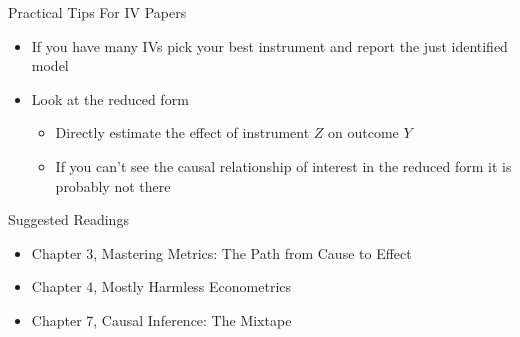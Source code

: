 \documentclass[dvipsnames,hyperref={pdfpagelabels=false}]{beamer}
\begin{document}
\begin{frame}{Practical Tips For IV Papers}
	\begin{itemize}
		\item[3.] If you have many IVs pick your best instrument and report the just identified model 
		\vspace{0.2cm}
		\item[4.] Look at the reduced form
		\begin{itemize}
			\vspace{0.2cm}
			\item Directly estimate the effect of instrument $Z$ on outcome $Y$
			\vspace{0.2cm}
			\item If you can't see the causal relationship of interest in the reduced form it is probably not there
		\end{itemize}
	\end{itemize}
\end{frame}




\begin{frame}{Suggested Readings}
	\begin{itemize} 
		\item Chapter 3, Mastering Metrics: The Path from Cause to Effect
		\vspace{0.2cm}
		\item Chapter 4, Mostly Harmless Econometrics
		\vspace{0.2cm}
		\item Chapter 7, Causal Inference: The Mixtape
	\end{itemize}
\end{frame}
\end{document}
